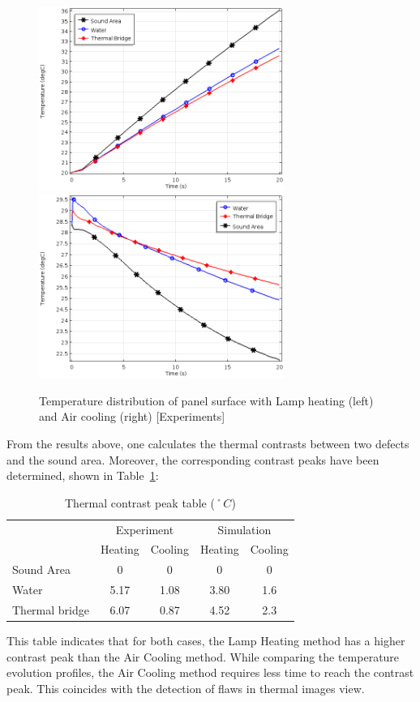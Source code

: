 \documentclass{tQRT2e}
\begin{document}
\begin{figure}
	\includegraphics[width=8cm, height=6cm]{Truck_panel_Flash_TGraph_4}
	\includegraphics[width=8cm, height=6cm]{Truck_panel_laminar_TGraph_4}
	\caption{Temperature distribution of panel surface with Lamp heating (left) and Air cooling (right) [Experiments]}
	\label{sim_fig}
\end{figure}
From the results above, one calculates the thermal contrasts between two defects and the sound area. Moreover, the corresponding contrast peaks have been determined, shown in Table~\ref{tab_TCP}:
\begin{table}[ht]
	\centering
	\caption{Thermal contrast peak table ($˚C$)}
	\begin{tabular}{l|cc|cc}
		\hline
		& \multicolumn{2}{c|}{Experiment} & \multicolumn{2}{c}{Simulation} \\
		 & Heating & Cooling & Heating & Cooling \\
		\hline
		Sound Area & 0 & 0 & 0 & 0 \\
		Water & 5.17 & 1.08 & 3.80 & 1.6 \\
		Thermal bridge & 6.07 & 0.87 & 4.52 & 2.3 \\
		\hline
	\end{tabular}
	\label{tab_TCP}
\end{table}
This table indicates that for both cases, the Lamp Heating method has a higher contrast peak than the Air Cooling method. While comparing the temperature evolution profiles, the Air Cooling method requires less time to reach the contrast peak. This coincides with the detection of flaws in thermal images view.
\end{document}
